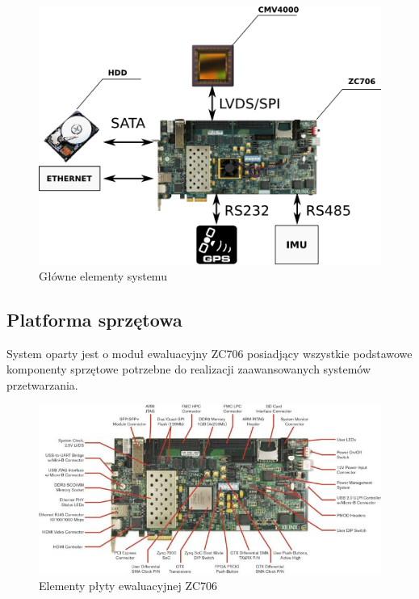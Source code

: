 \documentclass[a4paper,11pt,oneside]{article}  %
\begin{document}
\begin{figure}[!h]
	\centering
	\includegraphics[width=12cm]{OVER2.png}
	\caption{Główne elementy systemu}
	\label{fig:OVER}
\end{figure}

\subsection{Platforma sprzętowa}
System oparty jest o moduł ewaluacyjny ZC706 posiadjący wszystkie podstawowe komponenty sprzętowe potrzebne do realizacji zaawansowanych systemów przetwarzania.

\begin{figure}[H]
	\centering
	\includegraphics[width=12cm]{zc706-base-board.jpg}
	\caption{Elementy płyty ewaluacyjnej ZC706}
	\label{fig:ZC706}
\end{figure}
\end{document}
